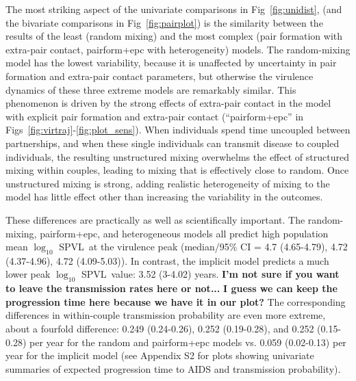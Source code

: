 \documentclass[10pt,letterpaper]{article}
\renewcommand{\figurename}{Fig}
\newcommand{\Lspvl}{$\log_{10}$ SPVL}
\newcommand{\todo}[1]{\color{red} \textbf{#1}}
\begin{document}
The most striking aspect of the univariate comparisons in
\figurename~\ref{fig:unidist}, (and the bivariate comparisons in
\figurename~\ref{fig:pairplot}) is the similarity between the results of the
least (random mixing) and the most complex (pair formation with
extra-pair contact, pairform+epc with heterogeneity) models. The random-mixing model has the lowest variability, because it is unaffected by uncertainty in pair formation and extra-pair contact parameters, but otherwise the virulence
dynamics of these three extreme models are remarkably similar.
This phenomenon is driven by the strong effects of extra-pair contact in the
model with explicit pair formation and extra-pair contact 
(``pairform+epc'' in \figurename{}s~\ref{fig:virtraj}-\ref{fig:plot_sens}). When individuals spend time uncoupled between
partnerships, and when these single individuals can transmit disease
to coupled individuals, the resulting unstructured mixing overwhelms
the effect of structured mixing within couples, leading to mixing
that is effectively close to random.
Once unstructured mixing is strong, adding realistic heterogeneity
of mixing to the model has little effect other than increasing
the variability in the outcomes.

These differences are practically as well as 
scientifically important. The random-mixing, pairform+epc,
and heterogeneous models all predict high population mean \Lspvl\ at the virulence peak
(median/95\% CI = 4.7 (4.65-4.79), 
4.72 (4.37-4.96), 4.72  (4.09-5.03)). 
In contrast, 
the implicit model predicts a much lower peak \Lspvl\ value:
3.52 (3-4.02) years.
\todo{I'm not sure if you want to leave the transmission rates here or not...}
\todo{I guess we can keep the progression time here because we have it in our plot?}
The corresponding differences in 
within-couple transmission
probability are even more extreme, about a fourfold difference:
0.249 (0.24-0.26), 0.252 (0.19-0.28), and 0.252 (0.15-0.28) per year for the 
random and pairform+epc models vs. 0.059 (0.02-0.13) per year
for the implicit model (see Appendix S2 for 
plots showing univariate summaries
of expected progression time to AIDS and transmission probability).
\end{document}
